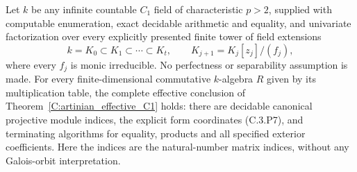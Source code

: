 \begin{theorem}
\label{C:artinian_effective_imperfect_C1}
Let $k$ be any infinite countable $C_1$ field of characteristic
$p>2$, supplied with computable enumeration, exact decidable
arithmetic and equality, and univariate factorization over
every explicitly presented finite tower of field extensions
\[
 k=K_0\subset K_1\subset\cdots\subset K_t,\qquad
             K_{j+1}=K_j[z_j]/(f_j),                     \tag{C.3.P11}
\]
where every $f_j$ is monic irreducible. No perfectness or
separability assumption is made.
For every finite-dimensional commutative $k$-algebra $R$
given by its multiplication table, the complete effective
conclusion of Theorem~\ref{C:artinian_effective_C1} holds:
there are decidable canonical projective module indices,
the explicit form coordinates (C.3.P7), and terminating
algorithms for equality, products and all specified
exterior coefficients. Here the indices are the
natural-number matrix indices, without any Galois-orbit
interpretation.
\end{theorem}
